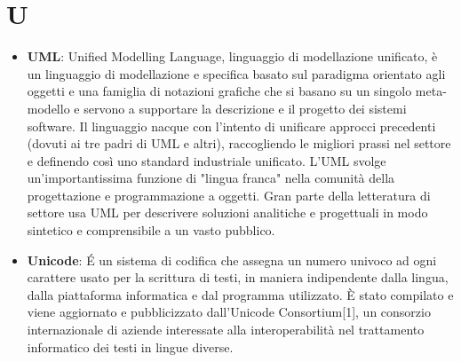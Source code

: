 \section{U}
\begin{itemize} 
	\item
	\textbf{UML}: Unified Modelling Language, linguaggio di modellazione unificato, è un linguaggio di modellazione e specifica basato sul paradigma orientato agli oggetti e una famiglia di notazioni grafiche che si basano su un singolo meta-modello e servono a supportare la descrizione e il progetto dei sistemi software.  Il linguaggio nacque con l'intento di unificare approcci precedenti (dovuti ai tre padri di UML e altri), raccogliendo le migliori prassi nel settore e definendo così uno standard industriale unificato.
	L'UML svolge un'importantissima funzione di "lingua franca" nella comunità della progettazione e programmazione a oggetti. Gran parte della letteratura di settore usa UML per descrivere soluzioni analitiche e progettuali in modo sintetico e comprensibile a un vasto pubblico.
	\item
	\textbf{Unicode}: É un sistema di codifica che assegna un numero univoco ad ogni carattere usato per la scrittura di testi, in maniera indipendente dalla lingua, dalla piattaforma informatica e dal programma utilizzato.
	È stato compilato e viene aggiornato e pubblicizzato dall'Unicode Consortium[1], un consorzio internazionale di aziende interessate alla interoperabilità nel trattamento informatico dei testi in lingue diverse.
\end{itemize}